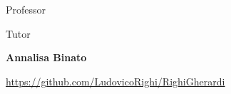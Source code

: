 \begin{center}
\vspace{0.4\baselineskip}
    {Professor \par}
\vspace{0.2\baselineskip}
    {{\large \bf \mysupervisor} \par}
\vspace{1\baselineskip}
    {Tutor \par}
\vspace{0.2\baselineskip}
    {{\large \bf Annalisa Binato} \par}
\vspace{0.1\baselineskip}
    {{\small  \underline{\href{https://github.com/LudovicoRighi/RighiGherardi}{https://github.com/LudovicoRighi/RighiGherardi}}} \par}
\vspace*{1ex}
 \end{center}